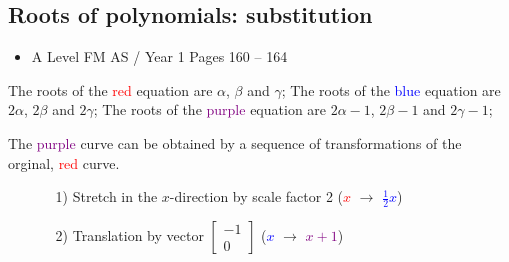 \documentclass[11pt, a4paper]{article}
\begin{document}
\subsection{Roots of polynomials: substitution}
\begin{itemize}
\item A Level FM AS / Year 1 \hspace{1cm} Pages 160 -- 164
\end{itemize} \par
\begin{figure}[H]
     \centering
\end{figure}

\noindent
The roots of the \textcolor{red}{red} equation are $\alpha$, $\beta$ and $\gamma$; \newline
The roots of the \textcolor{blue}{blue} equation are $2\alpha$, $2\beta$ and $2\gamma$; \newline
The roots of the \textcolor{purple}{purple} equation are $2\alpha-1$, $2\beta-1$ and $2\gamma-1$; \newline \par

The \textcolor{purple}{purple} curve can be obtained by a sequence of transformations of the orginal, \textcolor{red}{red} curve.
\begin{itemize}
\item[]
\vspace{-0.25cm}
\begin{itemize}
\item[1)] Stretch in the $x$-direction by scale factor 2 (\textcolor{red}{$x$} $\rightarrow$ \textcolor{blue}{$\frac{1}{2}x$})
\vspace{-0.15cm}
\item[2)] Translation by vector \scriptsize $\begin{bmatrix}-1\\0\end{bmatrix}$ \normalsize (\textcolor{blue}{$x$} $\rightarrow$ \textcolor{purple}{$x+1$})
\end{itemize}
\end{itemize}
\end{document}
